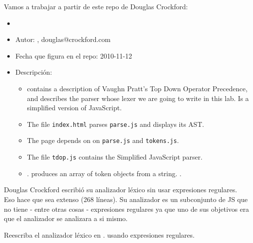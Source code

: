 Vamos a trabajar a partir de este repo de Douglas Crockford:
\begin{itemize}
\item
{}
\item Autor: 
, douglas@crockford.com

\item Fecha que figura en el repo: 2010-11-12

\item Descripción:

\begin{itemize}
\item
{}
 contains a description of Vaughn Pratt's Top Down Operator Precedence,
and describes  the parser whose lexer we are going to write in 
this lab. Is a simplified version of JavaScript.

\item
The file 
\verb|index.html| parses \verb|parse.js| and displays its AST. 
\item
The page depends on 
on \verb|parse.js| and \verb|tokens.js|.
\item
The file \verb|tdop.js| contains the Simplified JavaScript parser. 
\item
{}.
produces an array of token objects from a string.
.
\end{itemize}
\end{itemize}


Douglas Crockford escribió su analizador léxico 
sin usar expresiones regulares.
Eso hace que sea extenso (268 líneas). Su analizador es un subconjunto de JS que no tiene 
- entre otras cosas - expresiones regulares ya que
uno de sus objetivos era que el analizador 
se analizara a si mismo.

Reescriba el analizador léxico en %
.
usando expresiones regulares.

